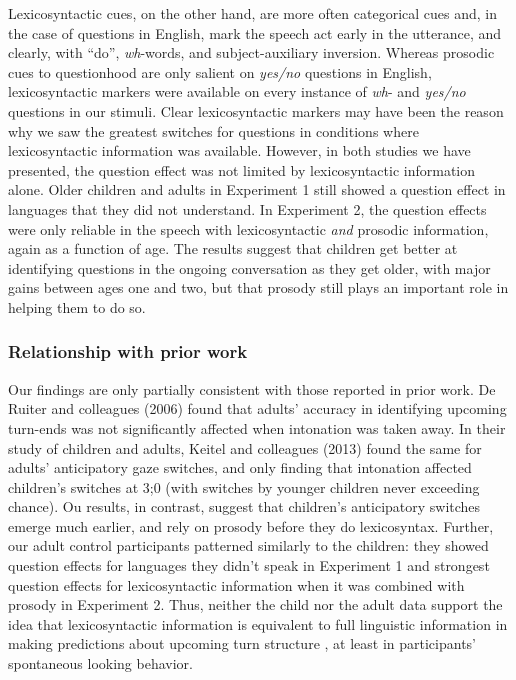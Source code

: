 \documentclass[authoryear, 12pt]{elsarticle}
\begin{document}
Lexicosyntactic cues, on the other hand, are more often categorical cues and, in the case of questions in English, mark the speech act early in the utterance, and clearly, with ``do'', \textit{wh}-words, and subject-auxiliary inversion. Whereas prosodic cues to questionhood are only salient on \textit{yes/no} questions in English, lexicosyntactic markers were available on every instance of \textit{wh}- and \textit{yes/no} questions in our stimuli. Clear lexicosyntactic markers may have been the reason why we saw the greatest switches for questions in conditions where lexicosyntactic information was available. However, in both studies we have presented, the question effect was not limited by lexicosyntactic information alone. Older children and adults in Experiment 1 still showed a question effect in languages that they did not understand. In Experiment 2, the question effects were only reliable in the speech with lexicosyntactic \textit{and} prosodic information, again as a function of age. The results suggest that children get better at identifying questions in the ongoing conversation as they get older, with major gains between ages one and two, but that prosody still plays an important role in helping them to do so.

\subsubsection{Relationship with prior work}

Our findings are only partially consistent with those reported in prior work. De Ruiter and colleagues (2006) found that adults' accuracy in identifying upcoming turn-ends was not significantly affected when intonation was taken away. In their study of children and adults, Keitel and colleagues (2013) found the same for adults' anticipatory gaze switches, and only finding that intonation affected children's switches at 3;0 (with switches by younger children never exceeding chance). Ou results, in contrast, suggest that children's anticipatory switches emerge much earlier, and rely on prosody before they do lexicosyntax. Further, our adult control participants patterned similarly to the children: they showed question effects for languages they didn't speak in Experiment 1 and strongest question effects for lexicosyntactic information when it was combined with prosody in Experiment 2. Thus, neither the child nor the adult data support the idea that lexicosyntactic information is equivalent to full linguistic information in making predictions about upcoming turn structure \citep{de-ruiter2006}, at least in participants' spontaneous looking behavior.
\end{document}
